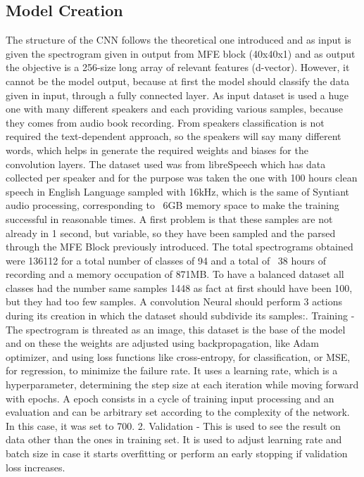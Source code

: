 \subsection{Model Creation}
\label{subsec:model creation}
The structure of the CNN follows the theoretical one introduced and as input is given the spectrogram given in output from MFE block (40x40x1) and as output the objective is a 256-size long array of relevant features (d-vector). However, it cannot be the model output, because at first the model should classify the data given in input, through a fully connected layer. As input dataset is used a huge one with many different speakers and each providing various samples, because they comes from audio book recording. From speakers classification is not required the text-dependent approach, so the speakers will say many different words, which helps in generate the required weights and biases for the convolution layers. The dataset used was from libreSpeech which has data collected per speaker and for the purpose was taken the one with 100 hours clean speech in English Language sampled with 16kHz, which is the same of Syntiant audio processing\cite{librispeech}, corresponding to ~6GB memory space to make the training successful in reasonable times.\newline
A first problem is that these samples are not already in 1 second, but variable, so they have been sampled and the parsed through the MFE Block previously introduced. The total spectrograms obtained were 136112 for a total number of classes of 94 and a total of ~38 hours of recording and a memory occupation of 871MB. To have a balanced dataset all classes had the number same samples 1448 as fact at first should have been 100, but they had too few samples. A convolution Neural should perform 3 actions during its creation in which the dataset should subdivide its samples:. Training - The spectrogram is threated as an image, this dataset is the base of the model and on these the weights are adjusted using backpropagation, like Adam optimizer, and using loss functions like cross-entropy, for classification, or MSE, for regression, to minimize the failure rate. It uses a learning rate, which is a hyperparameter, determining the step size at each iteration while moving forward with epochs. A epoch consists in a cycle of training input processing and an evaluation and can be arbitrary set according to the complexity of the network. In this case, it was set to 700.
2. Validation - This is used to see the result on data other than the ones in training set. It is used to adjust learning rate and batch size in case it starts overfitting or perform an early stopping if validation loss increases.
